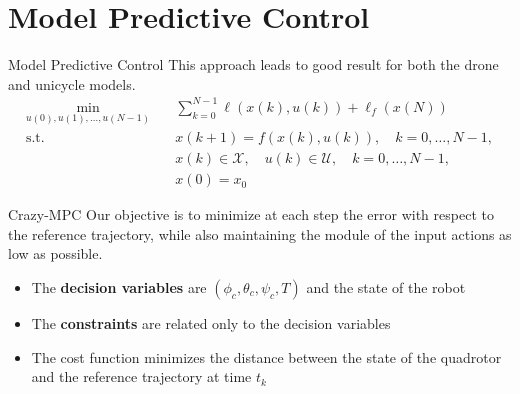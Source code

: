 \documentclass{beamer}
\begin{document}
\section{Model Predictive Control}
\begin{frame}{Model Predictive Control}
    This approach leads to good result for both the drone and unicycle models.
    \begin{align}
        \min_{u(0), u(1), \dots, u(N-1)} \quad & \sum_{k=0}^{N-1} \ell(x(k), u(k)) + \ell_f(x(N)) \\
        \text{s.t.} \quad & x(k+1) = f(x(k), u(k)), \quad k = 0, \dots, N-1, \\
        & x(k) \in \mathcal{X}, \quad u(k) \in \mathcal{U}, \quad k = 0, \dots, N-1, \\
        & x(0) = x_{\text{0}}
    \end{align}
\end{frame}
\begin{frame}{Crazy-MPC}
    Our objective is to minimize at each step the error with respect to the reference
    trajectory, while also maintaining the module of the input actions as low as possible.
    \begin{itemize}
        \item The \textbf{decision variables} are $(\phi_{c},\theta_{c},\psi_{c}, T)$ and the state of the robot
        \item The \textbf{constraints} are related only to the decision variables
        \item The cost function minimizes the distance between the state of the quadrotor and the reference trajectory at time $t_{k}$
    \end{itemize}
\end{frame}
\end{document}
